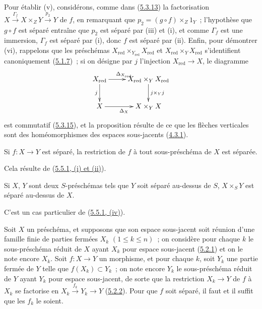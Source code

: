 Pour établir (v), considérons, comme dans
(\hyperref[I.5.3.13-fr]{5.3.13}) la factorisation
$X\xrightarrow{\Gamma_f}X\times_Z Y\xrightarrow{p_2}Y$ de $f$, en remarquant
que $p_2=(g\circ f)\times_Z 1_Y$~; l'hypothèse que $g\circ f$ est séparé
entraîne que $p_2$ est séparé par (iii) et (i), et comme $\Gamma_f$ est une
immersion, $\Gamma_f$ est séparé par (i), donc $f$ est séparé par (ii).
Enfin, pour démontrer (vi), rappelons que les préschémas
$X_{\mathrm{red}}\times_{Y_{\mathrm{red}}}X_{\mathrm{red}}$ et
$X_{\mathrm{red}}\times_Y X_{\mathrm{red}}$ s'identifient canoniquement
(\hyperref[I.5.1.7-fr]{5.1.7})~; si on désigne par $j$ l'injection
$X_{\mathrm{red}}\to X$, le diagramme
\[
  \xymatrix{
    X_{\mathrm{red}}\ar[r]^{\Delta_{X_{\mathrm{red}}}}\ar[d]_j &
    X_{\mathrm{red}}\times_Y X_{\mathrm{red}}\ar[d]^{j\times_Y j}\\
    X\ar[r]_{\Delta_X} & X\times_Y X
  }
\]
est commutatif (\hyperref[I.5.3.15-fr]{5.3.15}), et la proposition résulte de
ce que les flèches verticales sont des homéomorphismes des espaces
sous-jacents (\hyperref[I.4.3.1-fr]{4.3.1}).

\begin{corollary}[5.5.2]
\label{I.5.5.2-fr}
Si $f:X\to Y$ est séparé, la restriction de $f$ à tout sous-préschéma de $X$
est séparée.
\end{corollary}

Cela résulte de (\hyperref[I.5.5.1-fr]{5.5.1, (i) et (ii)}).

\begin{corollary}[5.5.3]
\label{I.5.5.3-fr}
Si $X$, $Y$ sont deux $S$-préschémas tels que $Y$ soit séparé au-dessus de
$S$, $X\times_S Y$ est séparé au-dessus de $X$.
\end{corollary}

C'est un cas particulier de (\hyperref[I.5.5.1-fr]{5.5.1, (iv)}).

\begin{proposition}[5.5.4]
\label{I.5.5.4-fr}
Soit $X$ un préschéma, et supposons que son espace sous-jacent soit réunion
d'une famille finie de parties fermées $X_k$ $(1\leq k\leq n)$~; on considère
pour chaque $k$ le sous-préschéma réduit de $X$ ayant $X_k$ pour espace
sous-jacent (\hyperref[I.5.2.1-fr]{5.2.1}) et on le note encore $X_k$. Soit
$f:X\to Y$ un morphisme, et pour chaque $k$, soit $Y_k$ une partie fermée de
$Y$ telle que $f(X_k)\subset Y_k$~; on note encore $Y_k$ le sous-préschéma
réduit de $Y$ ayant $Y_k$ pour espace sous-jacent, de sorte que la restriction
$X_k\to Y$ de $f$ à $X_k$ se factorise en
$X_k\xrightarrow{f_k}Y_k\to Y$ (\hyperref[I.5.2.2-fr]{5.2.2}). Pour que $f$
soit séparé, il faut et il suffit que les $f_k$ le soient.
\end{proposition}


